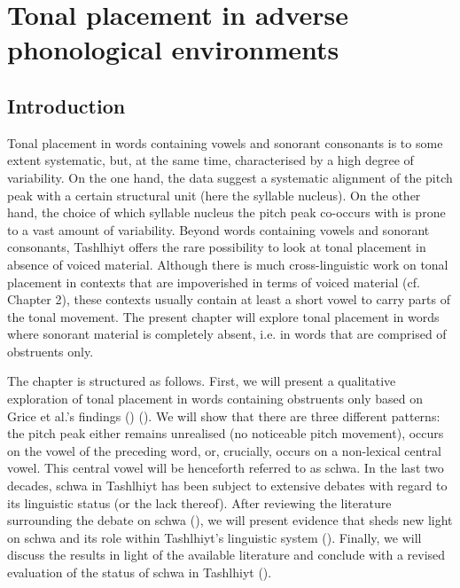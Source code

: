 \chapter{Tonal placement in adverse phonological environments}
\section{Introduction}
Tonal placement in words containing vowels and sonorant consonants is to some extent systematic, but, at the same time, characterised by a high degree of variability. On the one hand, the data suggest a systematic alignment of the pitch peak with a certain structural unit (here the syllable nucleus). On the other hand, the choice of which syllable nucleus the pitch peak co-occurs with is prone to a vast amount of variability. Beyond words containing vowels and sonorant consonants, Tashlhiyt offers the rare possibility to look at tonal placement in absence of voiced material. Although there is much cross-linguistic work on tonal placement in contexts that are impoverished in terms of voiced material (cf. Chapter 2), these contexts usually contain at least a short vowel to carry parts of the tonal movement. The present chapter will explore tonal placement in words where sonorant material is completely absent, i.e. in words that are comprised of obstruents only. 

The chapter is structured as follows. First, we will present a qualitative exploration of tonal placement in words containing obstruents only based on Grice et al.’s findings (\citeyear*{Grice.etal2015tash}) (). We will show that there are three different patterns: the pitch peak either remains unrealised (no noticeable pitch movement), occurs on the vowel of the preceding word, or, crucially, occurs on a non-lexical central vowel. This central vowel will be henceforth referred to as schwa. In the last two decades, schwa in Tashlhiyt has been subject to extensive debates with regard to its linguistic status (or the lack thereof). After reviewing the literature surrounding the debate on schwa (), we will present evidence that sheds new light on schwa and its role within Tashlhiyt’s linguistic system (). Finally, we will discuss the results in light of the available literature and conclude with a revised evaluation of the status of schwa in Tashlhiyt ().

